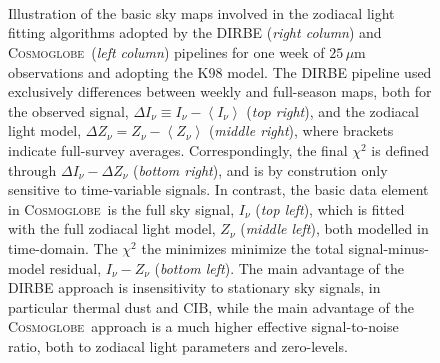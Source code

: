 \documentclass[twocolumn]{aa}
\def\Cosmoglobe{\textsc{Cosmoglobe}}
\begin{document}
\begin{figure}
    \centering
    \\
    \\
    \\
    \caption{Illustration of the basic sky maps involved in the zodiacal 
    light fitting algorithms adopted by the DIRBE (\emph{right column}) 
    and \Cosmoglobe\ (\emph{left column}) pipelines for one week of 
    $25\,\mu\mathrm{m}$ observations and adopting the K98 model. The 
    DIRBE pipeline used exclusively differences between weekly and 
    full-season maps, both for the observed signal, 
    $\Delta I_{\nu} \equiv I_{\nu}-\left<I_{\nu}\right>$ (\emph{top right}), 
    and the zodiacal light model, 
    $\Delta Z_{\nu} = Z_{\nu}-\left<Z_{\nu}\right>$ (\emph{middle right}), 
    where brackets indicate full-survey averages. Correspondingly, the 
    final $\chi^2$ is defined through $\Delta I_{\nu} - \Delta Z_{\nu}$ 
    (\emph{bottom right}), and is by constrution only sensitive to 
    time-variable signals. In contrast, the basic data element in 
    \Cosmoglobe\ is the full sky signal, $I_{\nu}$ (\emph{top left}), 
    which is fitted with the full zodiacal light model, $Z_{\nu}$ 
    (\emph{middle left}), both modelled in time-domain. The $\chi^2$ 
    the minimizes minimize the total signal-minus-model residual, 
    $I_{\nu}-Z_{\nu}$ (\emph{bottom left}). The main advantage of the 
    DIRBE approach is insensitivity to stationary sky signals, in 
    particular thermal dust and CIB, while the main advantage of the 
    \Cosmoglobe\ approach is a much higher effective signal-to-noise 
    ratio, both to zodiacal light parameters and zero-levels.}
    \label{fig:week_vs_full}
\end{figure}
\end{document}
